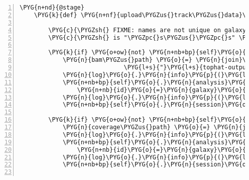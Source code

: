 \begin{Verbatim}[commandchars=\\\{\},numbers=left,firstnumber=1,stepnumber=5]
    \PYG{n+nd}{@stage}
    \PYG{k}{def} \PYG{n+nf}{upload\PYGZus{}track\PYGZus{}data}\PYG{p}{(}\PYG{n+nb+bp}{self}\PYG{p}{)}\PYG{p}{:}

        \PYG{c}{\PYGZsh{} FIXME: names are not unique on galaxy:}
        \PYG{c}{\PYGZsh{} is "\PYGZpc{}s\PYGZus{}\PYGZpc{}s" \PYGZpc{} (srr\PYGZus{}name, self.analysis.org\PYGZus{}accession) good enough ?}

        \PYG{k}{if} \PYG{o+ow}{not} \PYG{n+nb+bp}{self}\PYG{o}{.}\PYG{n}{analysis}\PYG{o}{.}\PYG{n}{galaxy\PYGZus{}bam}\PYG{p}{:}
            \PYG{n}{bam\PYGZus{}path} \PYG{o}{=} \PYG{n}{join}\PYG{p}{(}\PYG{n+nb+bp}{self}\PYG{o}{.}\PYG{n}{analysis}\PYG{o}{.}\PYG{n}{data\PYGZus{}dir}\PYG{p}{,} 
                             \PYG{l+s}{"}\PYG{l+s}{tophat-output}\PYG{l+s}{"}\PYG{p}{,} \PYG{l+s}{"}\PYG{l+s}{accepted\PYGZus{}hits.bam}\PYG{l+s}{"}\PYG{p}{)}
            \PYG{n}{log}\PYG{o}{.}\PYG{n}{info}\PYG{p}{(}\PYG{l+s}{"}\PYG{l+s}{uploading accepted\PYGZus{}hits.bam to galaxy}\PYG{l+s}{"}\PYG{p}{)}
            \PYG{n+nb+bp}{self}\PYG{o}{.}\PYG{n}{analysis}\PYG{o}{.}\PYG{n}{galaxy\PYGZus{}bam} \PYG{o}{=} \PYG{n}{GalaxyDataset}\PYG{p}{(}
                \PYG{n+nb}{id}\PYG{o}{=}\PYG{n}{galaxy}\PYG{o}{.}\PYG{n}{upload}\PYG{p}{(}\PYG{n+nb}{open}\PYG{p}{(}\PYG{n}{bam\PYGZus{}path}\PYG{p}{)}\PYG{p}{,} \PYG{n+nb+bp}{self}\PYG{o}{.}\PYG{n}{bam\PYGZus{}name}\PYG{p}{)}\PYG{p}{)}
            \PYG{n}{log}\PYG{o}{.}\PYG{n}{info}\PYG{p}{(}\PYG{l+s}{"}\PYG{l+s}{...done - id: }\PYG{l+s+si}{\PYGZpc{}s}\PYG{l+s}{"} \PYG{o}{\PYGZpc{}} \PYG{n+nb+bp}{self}\PYG{o}{.}\PYG{n}{analysis}\PYG{o}{.}\PYG{n}{galaxy\PYGZus{}bam}\PYG{o}{.}\PYG{n}{id}\PYG{p}{)}
            \PYG{n+nb+bp}{self}\PYG{o}{.}\PYG{n}{session}\PYG{o}{.}\PYG{n}{commit}\PYG{p}{(}\PYG{p}{)}

        \PYG{k}{if} \PYG{o+ow}{not} \PYG{n+nb+bp}{self}\PYG{o}{.}\PYG{n}{analysis}\PYG{o}{.}\PYG{n}{galaxy\PYGZus{}coverage}\PYG{p}{:}
            \PYG{n}{coverage\PYGZus{}path} \PYG{o}{=} \PYG{n}{join}\PYG{p}{(}\PYG{n+nb+bp}{self}\PYG{o}{.}\PYG{n}{analysis}\PYG{o}{.}\PYG{n}{data\PYGZus{}dir}\PYG{p}{,} \PYG{l+s}{"}\PYG{l+s}{coverage.bigwig}\PYG{l+s}{"}\PYG{p}{)}
            \PYG{n}{log}\PYG{o}{.}\PYG{n}{info}\PYG{p}{(}\PYG{l+s}{"}\PYG{l+s}{uploading coverage.bigwig to galaxy}\PYG{l+s}{"}\PYG{p}{)}
            \PYG{n+nb+bp}{self}\PYG{o}{.}\PYG{n}{analysis}\PYG{o}{.}\PYG{n}{galaxy\PYGZus{}coverage} \PYG{o}{=} \PYG{n}{GalaxyDataset}\PYG{p}{(}
                \PYG{n+nb}{id}\PYG{o}{=}\PYG{n}{galaxy}\PYG{o}{.}\PYG{n}{upload}\PYG{p}{(}\PYG{n+nb}{open}\PYG{p}{(}\PYG{n}{coverage\PYGZus{}path}\PYG{p}{)}\PYG{p}{,} \PYG{n+nb+bp}{self}\PYG{o}{.}\PYG{n}{coverage\PYGZus{}name}\PYG{p}{)}\PYG{p}{)}
            \PYG{n}{log}\PYG{o}{.}\PYG{n}{info}\PYG{p}{(}\PYG{l+s}{"}\PYG{l+s}{...done - id: }\PYG{l+s+si}{\PYGZpc{}s}\PYG{l+s}{"} \PYG{o}{\PYGZpc{}} \PYG{n+nb+bp}{self}\PYG{o}{.}\PYG{n}{analysis}\PYG{o}{.}\PYG{n}{galaxy\PYGZus{}coverage}\PYG{o}{.}\PYG{n}{id}\PYG{p}{)}
            \PYG{n+nb+bp}{self}\PYG{o}{.}\PYG{n}{session}\PYG{o}{.}\PYG{n}{commit}\PYG{p}{(}\PYG{p}{)}


\end{Verbatim}

